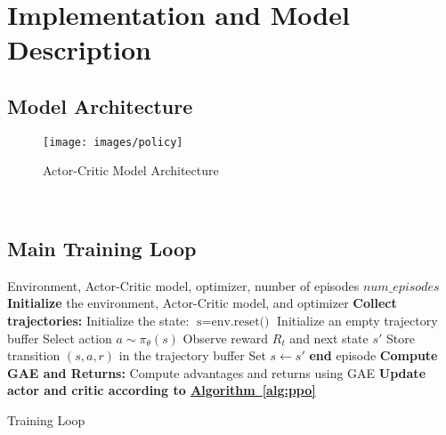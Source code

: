 \section{Implementation and Model Description}
\label{sec:implementation-and-model-description}

\subsection{Model Architecture}
\label{subsec:model-architecture}

\begin{figure}[H]
    \centering
    \texttt{[image: images/policy]}
    \caption{Actor-Critic Model Architecture}
    \label{fig:model-architecture}
\end{figure}\

\subsection{Main Training Loop}
\label{subsec:main-training-loop}

\begin{algorithm}[H]
    \begin{algorithmic}[1]
        \Require Environment, Actor-Critic model, optimizer, number of episodes $num\_episodes$
        \State \textbf{Initialize} the environment, Actor-Critic model, and optimizer
            \State \textbf{Collect trajectories:}
            \State \hspace{1em} Initialize the state: $\text{s} = \text{env.reset()}$
            \State \hspace{1em} Initialize an empty trajectory buffer
                \State \hspace{1em} Select action $a \sim \pi_{\theta}(s)$
                \State \hspace{1em} Observe reward $R_t$ and next state $s'$
                \State \hspace{1em} Store transition $(s, a, r)$ in the trajectory buffer
                \State \hspace{1em} Set $s \leftarrow s'$
                    \State \hspace{1em} \textbf{end} episode
                \EndIf
            \EndFor
            \State \textbf{Compute GAE and Returns:}
            \State \hspace{1em} Compute advantages and returns using GAE
            \State \textbf{Update actor and critic according to \hyperref[alg:algorithm]{Algorithm~\ref{alg:ppo}}}
        \EndFor
    \end{algorithmic}
    \caption{Training Loop}
    \label{alg:algorithm}
\end{algorithm}

%

